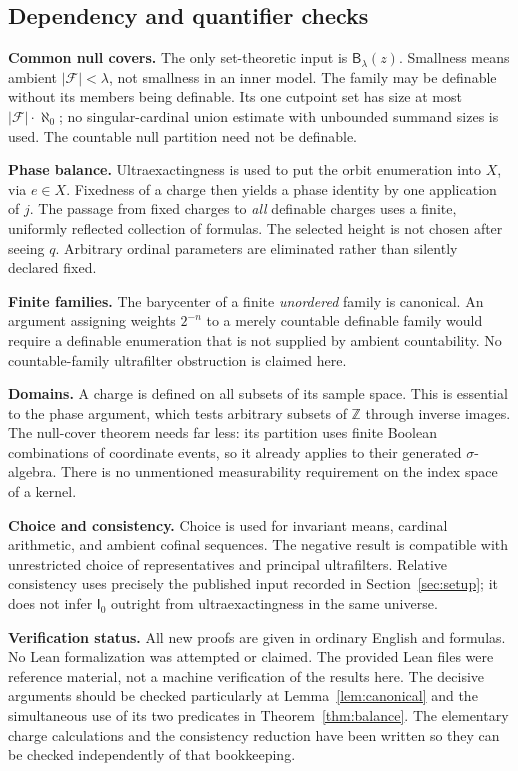 \documentclass[11pt,letterpaper]{article}
\theoremstyle{definition}
\newcommand{\Izero}{\mathsf I_0}
\newcommand{\Blam}[1]{\mathsf B_\lambda(#1)}
\begin{document}
\subsection{Dependency and quantifier checks}

\textbf{Common null covers.} The only set-theoretic input is $\Blam z$. Smallness means ambient $|\mathcal F|<\lambda$, not smallness in an inner model. The family may be definable without its members being definable. Its one cutpoint set has size at most $|\mathcal F|\cdot\aleph_0$; no singular-cardinal union estimate with unbounded summand sizes is used. The countable null partition need not be definable.

\textbf{Phase balance.} Ultraexactingness is used to put the orbit enumeration into $X$, via $e\in X$. Fixedness of a charge then yields a phase identity by one application of $j$. The passage from fixed charges to \emph{all} definable charges uses a finite, uniformly reflected collection of formulas. The selected height is not chosen after seeing $q$. Arbitrary ordinal parameters are eliminated rather than silently declared fixed.

\textbf{Finite families.} The barycenter of a finite \emph{unordered} family is canonical. An argument assigning weights $2^{-n}$ to a merely countable definable family would require a definable enumeration that is not supplied by ambient countability. No countable-family ultrafilter obstruction is claimed here.

\textbf{Domains.} A charge is defined on all subsets of its sample space. This is essential to the phase argument, which tests arbitrary subsets of $\mathbb Z$ through inverse images. The null-cover theorem needs far less: its partition uses finite Boolean combinations of coordinate events, so it already applies to their generated $\sigma$-algebra. There is no unmentioned measurability requirement on the index space of a kernel.

\textbf{Choice and consistency.} Choice is used for invariant means, cardinal arithmetic, and ambient cofinal sequences. The negative result is compatible with unrestricted choice of representatives and principal ultrafilters. Relative consistency uses precisely the published input recorded in Section~\ref{sec:setup}; it does not infer $\Izero$ outright from ultraexactingness in the same universe.

\textbf{Verification status.} All new proofs are given in ordinary English and formulas. No Lean formalization was attempted or claimed. The provided Lean files were reference material, not a machine verification of the results here. The decisive arguments should be checked particularly at Lemma~\ref{lem:canonical} and the simultaneous use of its two predicates in Theorem~\ref{thm:balance}. The elementary charge calculations and the consistency reduction have been written so they can be checked independently of that bookkeeping.
\end{document}
